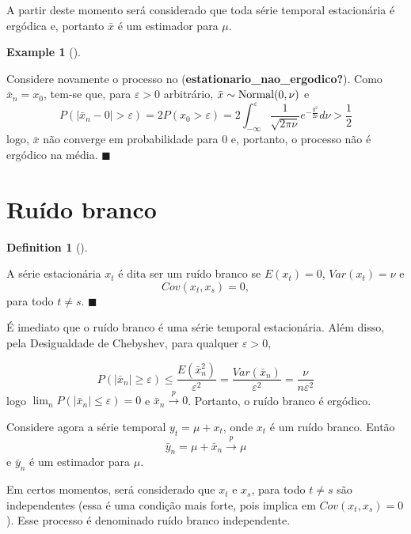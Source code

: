 \documentclass[
  letterpaper,
  DIV=11,
  numbers=noendperiod]{scrreprt}
\theoremstyle{plain}
\theoremstyle{definition}
\newtheorem{definition}{Definition}[chapter]
\theoremstyle{definition}
\newtheorem{example}{Example}[chapter]
\theoremstyle{remark}
\begin{document}
A partir deste momento será considerado que toda série temporal
estacionária é ergódica e, portanto \(\bar{x}\) é um estimador para
\(\mu\).

\begin{example}[]\protect\hypertarget{exm-estationario_nao_ergodico_conclusao}{}\label{exm-estationario_nao_ergodico_conclusao}

Considere novamente o processo no
(\textbf{estationario\_nao\_ergodico?}). Como \(\bar{x}_n=x_0\), tem-se
que, para \(\varepsilon>0\) arbitrário,
\(\bar{x}\sim\hbox{Normal}(0,\nu)\) e
\[P(|\bar{x}_n-0|>\varepsilon)=2P(x_0>\varepsilon)=2\int_{-\infty}^\varepsilon \frac{1}{\sqrt{2\pi\nu}}e^{-\frac{y^2}{2\nu}}d\nu>\frac{1}{2}\]
logo, \(\bar{x}\) não converge em probabilidade para \(0\) e, portanto,
o processo não é ergódico na média. \(\blacksquare\)

\end{example}

\hypertarget{ruuxeddo-branco}{%
\section{Ruído branco}\label{ruuxeddo-branco}}

\begin{definition}[]\protect\hypertarget{def-ruido_branco}{}\label{def-ruido_branco}

A série estacionária \(x_t\) é dita ser um ruído branco se \(E(x_t)=0\),
\(Var(x_t)=\nu\) e \[\begin{equation}
        Cov(x_t,x_s)=0,
        \end{equation}\] para todo \(t\neq s\). \(\blacksquare\)

\end{definition}

É imediato que o ruído branco é uma série temporal estacionária. Além
disso, pela Desigualdade de Chebyshev, para qualquer \(\varepsilon>0\),

\[P\left(|\bar{x}_n|\geq\varepsilon\right)\leq \frac{E(\bar{x}_n^2)}{\varepsilon^2}=\frac{Var(\bar{x}_n)}{\varepsilon^2}=\frac{\nu}{n\varepsilon^2}\]
logo \(\lim_{n}P(|\bar{x}_n|\leq \varepsilon)=0\) e
\(\bar{x}_n\stackrel{p}{\rightarrow}0\). Portanto, o ruído branco é
ergódico.

Considere agora a série temporal \(y_t=\mu+x_t\), onde \(x_t\) é um
ruído branco. Então
\[\bar{y}_n=\mu+\bar{x}_n\stackrel{p}{\rightarrow}\mu\] e \(\bar{y}_n\)
é um estimador para \(\mu\).

Em certos momentos, será considerado que \(x_t\) e \(x_s\), para todo
\(t\neq s\) são independentes (essa é uma condição mais forte, pois
implica em \(Cov(x_t,x_s)=0\)). Esse processo é denominado ruído branco
independente.
\end{document}
